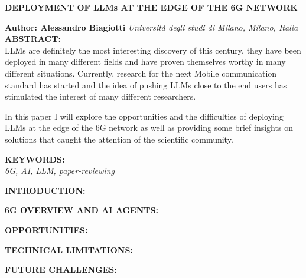 \documentclass[a4paper,10pt]{article}
\begin{document}
\noindent
\begin{center}
	\textbf{{\Large DEPLOYMENT OF LLMs AT THE EDGE OF THE 6G NETWORK}} \\
\end{center}

\noindent
\textbf{Author: Alessandro Biagiotti} \hfill \textit{Università degli studi di Milano, Milano, Italia}
\\

\noindent
\textbf{ABSTRACT:}
\\
LLMs are definitely the most interesting discovery of this century, they have been deployed in many different fields and have proven themselves worthy in many different situations. Currently, research for the next Mobile communication standard has started and the idea of pushing LLMs close to the end users has stimulated the interest of many different researchers.

In this paper I will explore the opportunities and the difficulties of deploying LLMs at the edge of the 6G network as well as providing some brief insights on solutions that caught the attention of the scientific community.

\bigskip
\noindent
\textbf{KEYWORDS:}
\\
\textit{6G, AI, LLM, paper-reviewing}

\clearpage

\noindent
\textbf{INTRODUCTION:}
\label{sec:introduction}
\\

\clearpage

\noindent
\textbf{6G OVERVIEW AND AI AGENTS:}
\makeatletter\def\@currentlabel{\texttt{(I)}}\makeatother
\label{sec:ai-agents}
\\

\clearpage


\noindent
\textbf{OPPORTUNITIES:}
\makeatletter\def\@currentlabel{\texttt{(II)}}\makeatother
\label{sec:opportunities}
\\

\clearpage


\noindent
\textbf{TECHNICAL LIMITATIONS:}
\makeatletter\def\@currentlabel{\texttt{(III)}}\makeatother
\label{sec:technical-limitations}
\\

\clearpage


\noindent
\textbf{FUTURE CHALLENGES:}
\makeatletter\def\@currentlabel{\texttt{(IV)}}\makeatother
\label{sec:future-challenges}
\\


\clearpage
\printbibliography
\end{document}
